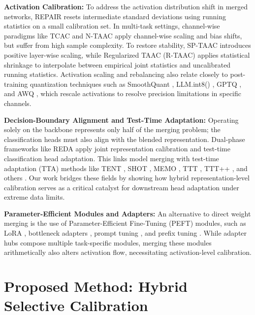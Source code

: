 \documentclass{article}
\begin{document}
\textbf{Activation Calibration:} To address the activation distribution shift in merged networks, REPAIR \cite{jordan2022repair} resets intermediate standard deviations using running statistics on a small calibration set. In multi-task settings, channel-wise paradigms like TCAC and N-TAAC apply channel-wise scaling and bias shifts, but suffer from high sample complexity. To restore stability, SP-TAAC \cite{anonymous2026sparsity} introduces positive layer-wise scaling, while Regularized TAAC (R-TAAC) applies statistical shrinkage to interpolate between empirical joint statistics and uncalibrated running statistics. Activation scaling and rebalancing also relate closely to post-training quantization techniques such as SmoothQuant \cite{pmlr-v202-xiao23c}, LLM.int8() \cite{dettmers2022llmint8}, GPTQ \cite{frantar2022gptq}, and AWQ \cite{lin2023awq}, which rescale activations to resolve precision limitations in specific channels.

\textbf{Decision-Boundary Alignment and Test-Time Adaptation:} Operating solely on the backbone represents only half of the merging problem; the classification heads must also align with the blended representation. Dual-phase frameworks like REDA \cite{anonymous2026catalyzing} apply joint representation calibration and test-time classification head adaptation. This links model merging with test-time adaptation (TTA) methods like TENT \cite{wang2021tent}, SHOT \cite{liang2020source}, MEMO \cite{zhang2022memo}, TTT \cite{sun2020test}, TTT++ \cite{lim2023ttt}, and others \cite{iwasawa2021test, boudiaf2022parameter, benz2021revisiting, schneider2020improving, nado2021evaluating}. Our work bridges these fields by showing how hybrid representation-level calibration serves as a critical catalyst for downstream head adaptation under extreme data limits.

\textbf{Parameter-Efficient Modules and Adapters:} An alternative to direct weight merging is the use of Parameter-Efficient Fine-Tuning (PEFT) modules, such as LoRA \cite{hu2021lora}, bottleneck adapters \cite{houlsby2019parameter, rebuffi2017learning}, prompt tuning \cite{lester2021power}, and prefix tuning \cite{li2021prefix}. While adapter hubs \cite{pfeiffer2020adapterhub} compose multiple task-specific modules, merging these modules arithmetically \cite{zhang2023composing} also alters activation flow, necessitating activation-level calibration.

\section{Proposed Method: Hybrid Selective Calibration}
\label{sec:method}
\end{document}
